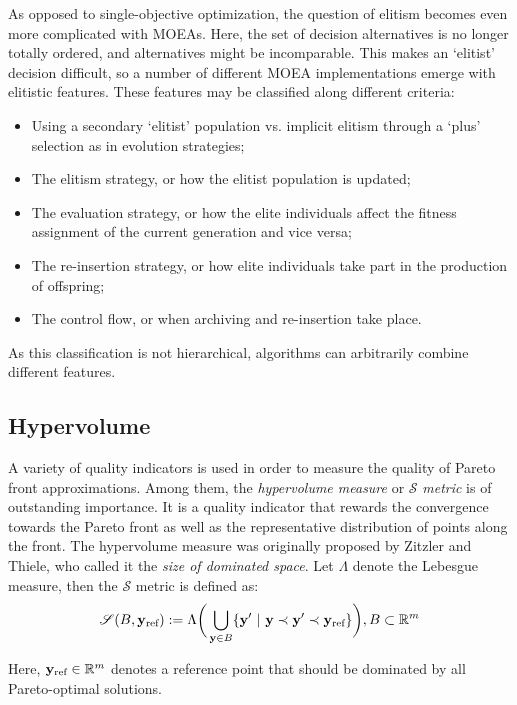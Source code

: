 \documentclass[%
 reprint,
 amsmath,amssymb,
 aps,
]{revtex4-2}
\newcommand{\bb}[1]
{\mathbb{#1}}
\begin{document}
As opposed to single-objective optimization, the question of
elitism becomes even more complicated with MOEAs. Here,
the set of decision alternatives is no longer totally ordered,
and alternatives might be incomparable. This makes an `elitist'
decision difficult, so a number of different MOEA implementations
emerge with elitistic features. These features may
be classified along different criteria:

\begin{itemize}
\item
Using a secondary `elitist' population vs. implicit elitism through a `plus' selection as in evolution strategies;
\item
The elitism strategy, or how the elitist population is updated;
\item
The evaluation strategy, or how the elite individuals affect the fitness assignment of the current generation and vice versa;
\item
The re-insertion strategy, or how elite individuals take part in the production of offspring;
\item
The control flow, or when archiving and re-insertion take place.
\end{itemize}

As this classification is not hierarchical, algorithms can arbitrarily
combine different features.

\subsection{\label{sec:level2}Hypervolume}

\cite{SMS-EMOA}A variety of quality indicators is used in order to measure the quality of Pareto front approximations. Among them, the \textit{hypervolume measure} or $\mathscr{S}$ \textit{metric} is of outstanding importance. It is a quality indicator that
rewards the convergence towards the Pareto front as well as the representative distribution of points along the
front. The hypervolume measure was originally proposed by Zitzler and Thiele, who called it the \textit{size of dominated space}. Let $\Lambda$ denote the Lebesgue measure, then the $\mathscr{S}$ metric is defined as:
\begin{equation}
\mathscr{S}(B, \bold{y}_\text{ref}) := \Lambda \bigg(
\bigcup_{\bold{y} \in B} \{\bold{y}' \ | \ \bold{y} \prec \bold{y}' \prec \bold{y}_\text{ref} \} \bigg),
B \subset \bb{R}^m
\end{equation}

Here, $\bold{y}_\text{ref} \in \bb{R}^m$ denotes a reference point that should be dominated by all Pareto-optimal solutions.
\end{document}
